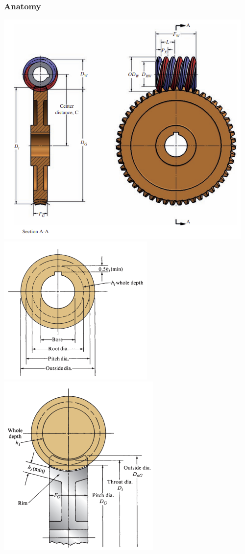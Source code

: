 \documentclass[11pt, fleqn]{article}
\begin{document}
\subsubsection{Anatomy}
\includegraphics[scale=1]{Gears/WormGearAnatomy.png}\\
\includegraphics[scale=1]{Gears/Worm1.png}\includegraphics[scale=1]{Gears/Worm2.png}
\end{document}
